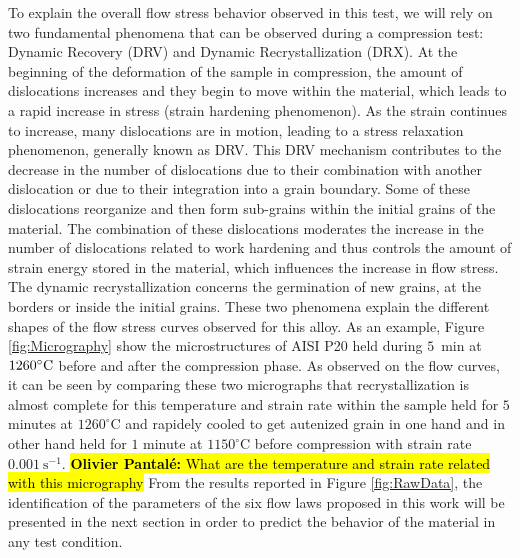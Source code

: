 \documentclass[twoside,english,1p,final,sort&compress]{elsarticle}
\theoremstyle{plain}
\DeclareRobustCommand{\OP}[1]{ {\begingroup\sethlcolor{VWyellow}\textcolor{red}{\hl{\textbf{Olivier Pantal\'e:} #1}}\endgroup} }
\begin{document}
To explain the overall flow stress behavior observed in this test, we will rely on two fundamental phenomena that can be observed during a compression test: Dynamic Recovery (DRV) and Dynamic Recrystallization (DRX).
At the beginning of the deformation of the sample in compression, the amount of dislocations increases and they begin to move within the material, which leads to a rapid increase in stress (strain hardening phenomenon).
As the strain continues to increase, many dislocations are in motion, leading to a stress relaxation phenomenon, generally known as DRV.
This DRV mechanism contributes to the decrease in the number of dislocations due to their combination with another dislocation or due to their integration into a grain boundary.
Some of these dislocations reorganize and then form sub-grains within the initial grains of the material.
The combination of these dislocations moderates the increase in the number of dislocations related to work hardening and thus controls the amount of strain energy stored in the material, which influences the increase in flow stress.
The dynamic recrystallization concerns the germination of new grains, at the borders or inside the initial grains.
These two phenomena explain the different shapes of the flow stress curves observed for this alloy.
As an example, Figure \ref{fig:Micrography} show the microstructures of AISI P20 held during $5$~min at $1260\celsius$ before and after the compression phase.
As observed on the flow curves, it can be seen by comparing these two micrographs that recrystallization is almost complete for this temperature and strain rate within the sample held for $5$ minutes at $1260^\circ$C and rapidely cooled to get autenized grain in one hand and in other hand held for $1$ minute at $1150^\circ$C before compression with strain rate $0.001\ \text{s}^{-1}$.
\OP{What are the temperature and strain rate related with this micrography}
From the results reported in Figure \ref{fig:RawData}, the identification of the parameters of the six flow laws proposed in this work will be presented in the next section in order to predict the behavior of the material in any test condition.
\end{document}
